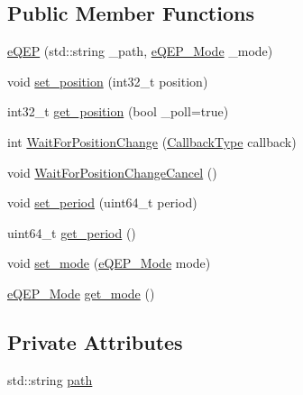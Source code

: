 \subsection*{Public Member Functions}
\begin{DoxyCompactItemize}
\item 
\hyperlink{class_hardware_1_1e_q_e_p_adc9ce642c8927e217afc3600a63002e5}{e\+Q\+E\+P} (std\+::string \+\_\+path, \hyperlink{class_hardware_1_1e_q_e_p_a3f97f26c64d49d6f2643a257b7249070}{e\+Q\+E\+P\+\_\+\+Mode} \+\_\+mode)
\item 
void \hyperlink{class_hardware_1_1e_q_e_p_aa55fc881377f4fc3396895de65ed9161}{set\+\_\+position} (int32\+\_\+t position)
\item 
int32\+\_\+t \hyperlink{class_hardware_1_1e_q_e_p_a3b06e47e9bb9a559e81427fe3e4f7cf9}{get\+\_\+position} (bool \+\_\+poll=true)
\item 
int \hyperlink{class_hardware_1_1e_q_e_p_a529f04118a9be4768c117c552ba34bd0}{Wait\+For\+Position\+Change} (\hyperlink{namespace_hardware_a5ba2e4bdfa2bbd8b551b1d5b2a0c61fd}{Callback\+Type} callback)
\item 
void \hyperlink{class_hardware_1_1e_q_e_p_aae8e9f7ac543384dac031fb81f092574}{Wait\+For\+Position\+Change\+Cancel} ()
\item 
void \hyperlink{class_hardware_1_1e_q_e_p_ae45ebd84fa06042ba6b9e5d5caccc1ed}{set\+\_\+period} (uint64\+\_\+t period)
\item 
uint64\+\_\+t \hyperlink{class_hardware_1_1e_q_e_p_a9ef725e955086baf06b9d8363318d5b3}{get\+\_\+period} ()
\item 
void \hyperlink{class_hardware_1_1e_q_e_p_a137d1fb0b0e5772487ece48254342294}{set\+\_\+mode} (\hyperlink{class_hardware_1_1e_q_e_p_a3f97f26c64d49d6f2643a257b7249070}{e\+Q\+E\+P\+\_\+\+Mode} mode)
\item 
\hyperlink{class_hardware_1_1e_q_e_p_a3f97f26c64d49d6f2643a257b7249070}{e\+Q\+E\+P\+\_\+\+Mode} \hyperlink{class_hardware_1_1e_q_e_p_a83f60cc0b6199828a629f54c0849ab16}{get\+\_\+mode} ()
\end{DoxyCompactItemize}
\subsection*{Private Attributes}
\begin{DoxyCompactItemize}
\item 
std\+::string \hyperlink{class_hardware_1_1e_q_e_p_a82718bc8478cde37f28fc685a859525e}{path}
\end{DoxyCompactItemize}
